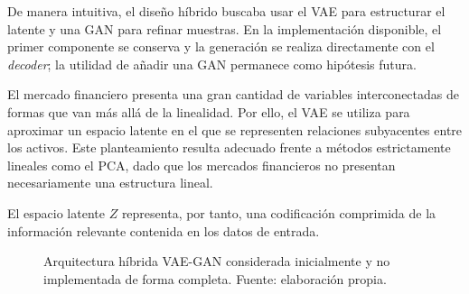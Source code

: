 De manera intuitiva, el diseño híbrido buscaba usar el VAE para estructurar el latente y una GAN para refinar muestras. En la implementación disponible, el primer componente se conserva y la generación se realiza directamente con el \textit{decoder}; la utilidad de añadir una GAN permanece como hipótesis futura.

El mercado financiero presenta una gran cantidad de variables interconectadas de formas que van más allá de la linealidad. Por ello, el VAE se utiliza para aproximar un espacio latente en el que se representen relaciones subyacentes entre los activos. Este planteamiento resulta adecuado frente a métodos estrictamente lineales como el PCA, dado que los mercados financieros no presentan necesariamente una estructura lineal.

El espacio latente $Z$ representa, por tanto, una codificación comprimida de la información relevante contenida en los datos de entrada.

\begin{figure}[H]
\centering
\shorthandoff{>}
\shorthandon{>}
\caption{Arquitectura híbrida VAE-GAN considerada inicialmente y no implementada de forma completa. Fuente: elaboración propia.}
\label{fig:arquitectura_vae_gan}
\end{figure}

